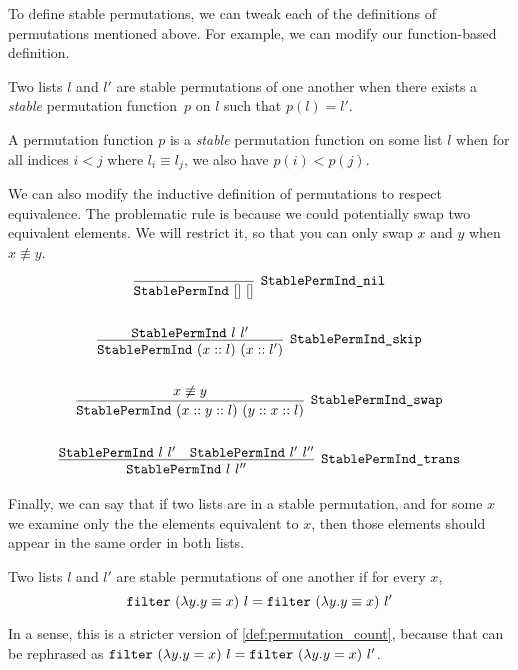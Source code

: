 \documentclass[sigplan,10pt,anonymous,review]{thesis}
\begin{document}
To define stable permutations, we can tweak each of the definitions of
permutations mentioned above. For example, we can modify our
function-based definition.

\begin{definition}[StablePermEx]
  Two lists $l$ and $l'$ are stable permutations of one another when
  there exists a \textit{stable} permutation function~$p$ on $l$ such
  that $p(l) = l'$.
\end{definition}

\begin{definition}[StablePermFun]
  \label{def:stablepermfun}
  A permutation function $p$ is a \textit{stable} permutation function
  on some list $l$ when for all indices $i < j$ where $l_i \equiv l_j$, we
  also have $p(i) < p(j)$.
\end{definition}

We can also modify the inductive definition of permutations to respect
equivalence. The problematic rule is  because we could
potentially swap two equivalent elements. We will restrict it, so that
you can only swap $x$ and $y$ when $x \nequiv y$.

\begin{definition}[StablePermInd]
  \begin{gather*}
    \infer[\var{StablePermInd\_nil}]{\var{StablePermInd}~[]~[]}{}
    \\ \\
    \infer[\var{StablePermInd\_skip}]{\var{StablePermInd}~(x :: l)~(x :: l')}{%
      \var{StablePermInd}~l~l'
    }
    \\ \\
    \infer[\var{StablePermInd\_swap}]
          {\var{StablePermInd}~(x :: y :: l)~(y :: x :: l)}
          {x \not\equiv y}
    \\ \\
    \infer[\var{StablePermInd\_trans}]{\var{StablePermInd}~l~l''}{
      \var{StablePermInd}~l~l' & \var{StablePermInd}~l'~l''
    }
  \end{gather*}
\end{definition}

Finally, we can say that if two lists are in a stable permutation, and
for some $x$ we examine only the the elements equivalent to $x$, then
those elements should appear in the same order in both lists.
\begin{definition}[StablePerm]
\item Two lists $l$ and $l'$ are stable permutations of one another if
  for every $x$,
  \begin{equation*}
    \texttt{\textup{filter}}~(\lambda y. y \equiv x)~l = \texttt{\textup{filter}}~(\lambda y. y \equiv x)~l'
  \end{equation*}
\end{definition}
In a sense, this is a stricter version of
\cref{def:permutation_count}, because that can be rephrased as
$\texttt{\textup{filter}}~(\lambda y. y = x)~l = \texttt{\textup{filter}}~(\lambda y. y = x)~l'$.
\end{document}
